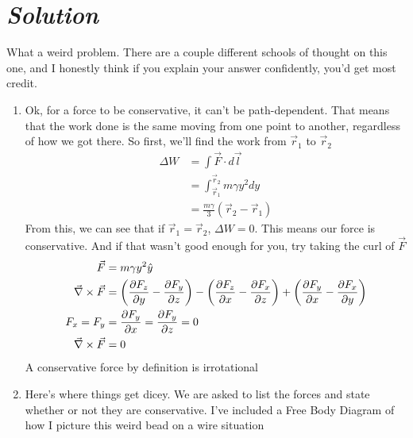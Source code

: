 \documentclass{article}
\newcommand{\vcurl}[1]{\vec{\nabla}\times \vec{#1}} %
\begin{document}
\section*{\textit{Solution}} 
What a weird problem. There are a couple different schools of thought on this one, and I honestly think if you explain your answer confidently, you'd get most credit. 
\begin{enumerate}[label=\alph*)]
	\item %
	Ok, for a force to be conservative, it can't be path-dependent. That means that the work done is the same moving from one point to another, regardless of how we got there. So first, we'll find the work from $\vec{r}_1$ to $\vec{r}_2$
	\begin{align}
	\Delta W &= \int \vec{F}\cdot d\vec{l} \\ 
	&= \int_{\vec{r}_1}^{\vec{r}_2} m\gamma y^2 dy \\
	&= \frac{m\gamma}{3}(\vec{r}_2 - \vec{r}_1)
	\end{align}
From this, we can see that if $\vec{r}_1 = \vec{r}_2$, $\Delta W = 0$. This means our force is conservative. And if that wasn't good enough for you, try taking the curl of $\vec{F}$
	\begin{align}
	\vec{F} &= m\gamma y^2 \hat{y} \\ 
	\vcurl{F} &= \left(\pdv{F_z}{y} - \pdv{F_y}{z} \right) - \left( \pdv{F_z}{x} - \pdv{F_x}{z} \right) + \left( \pdv{F_y}{x} - \pdv{F_x}{y} \right) \\
	F_x = F_y &= \pdv{F_y}{x} = \pdv{F_y}{z} = 0 \\ 
	\vcurl{F} &= 0 
	\end{align}	
A conservative force by definition is irrotational
	\item %
	Here's where things get dicey. We are asked to list the forces and state whether or not they are conservative. I've included a Free Body Diagram of how I picture this weird bead on a wire situation
	\begin{figure}[h]

\end{figure}
\end{enumerate}
\end{document}
